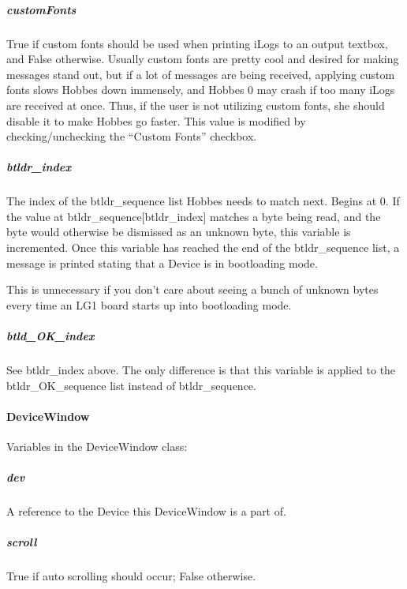 \documentclass[12pt,letterpaper]{article}
\begin{document}
%
%
\subparagraph{customFonts}
\label{4.3.2.2.24}

True if custom fonts should be used when printing iLogs to an output textbox, and False otherwise. Usually custom fonts are pretty cool and desired for making messages stand out, but if a lot of messages are being received, applying custom fonts slows Hobbes down immensely, and Hobbes 0 may crash if too many iLogs are received at once. Thus, if the user is not utilizing custom fonts, she should disable it to make Hobbes go faster. This value is modified by checking/unchecking the ``Custom Fonts'' checkbox.



%
%
\subparagraph{btldr\_index}
\label{4.3.2.2.25}

The index of the btldr\_sequence list Hobbes needs to match next. Begins at 0. If the value at btldr\_sequence[btldr\_index] matches a byte being read, and the byte would otherwise be dismissed as an unknown byte, this variable is incremented. Once this variable has reached the end of the btldr\_sequence list, a message is printed stating that a Device is in bootloading mode.

This is unnecessary if you don't care about seeing a bunch of unknown bytes every time an LG1 board starts up into bootloading mode.



%
%
\subparagraph{btld\_OK\_index}
\label{4.3.2.2.26}

See btldr\_index above. The only difference is that this variable is applied to the btldr\_OK\_sequence list instead of btldr\_sequence.



%
%
\paragraph{DeviceWindow}
\label{4.3.2.3}

Variables in the DeviceWindow class:

\setcounter{subparagraph}{-1}



%
%
\subparagraph{dev}
\label{4.3.2.3.0}

A reference to the Device this DeviceWindow is a part of.



%
%
\subparagraph{scroll}
\label{4.3.2.3.1}

True if auto scrolling should occur; False otherwise.
\end{document}
